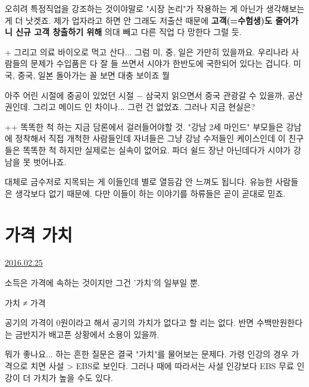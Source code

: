 오히려 특정직업을 강조하는 것이야말로 "시장 논리"가 작용하는 게 아닌가 생각해보는 게 더 낫겟죠.
제가 업자라고 하면 안 그래도 저출산 때문에 \textbf{고객(=수험생)도 줄어가니 신규 고객 창출하기 위해}
의대 빼고 다른 직업 다 망한다 그럴 듯.
\vspace{5mm}

+
그리고 의료 바이오로 먹고 산다... 그럼 미, 중, 일은 가만히 있을까요.
우리나라 사람들의 문제가 수입품은 다 잘 들 쓰면서 시야가 한반도에 국한되어 있다는 겁니다.
미국, 중국, 일본 돌아가는 꼴 보면 대충 보이죠 뭘
\vspace{5mm}

아주 어린 시절에 중공이 있었던 시절 $-$ 삼국지 읽으면서 중국 관광갈 수 있을까, 공산권인데.
그리고 메이드 인 차이나... 그런 건 없었죠. 그러나 지금 현실은?
\vspace{5mm}

++
똑똑한 척 하는 지금 담론에서 걸러들어야할 것. "강남 2세 마인드"
부모들은 강남에 정착해서 직접 개척한 사람들인데 자녀들은 그냥 강남 수저들인 케이스인데
이 친구들은 똑똑한 척 하지만 실제로는 실속이 없어요. 파더 쉴드 장난 아닌데다가 시야가 강남을 못 벗어나죠.
\vspace{5mm}

대체로 금수저로 지목되는 게 이들인데 별로 열등감 안 느껴도 됩니다. 유능한 사람들은 생각보다 없기 때문에.
다만 이들이 하는 이야기를 하류들은 곧이 곧대로 믿죠.
\vspace{5mm}





\section{가격 가치}
\href{https://www.kockoc.com/Apoc/650743}{2016.02.25}

\vspace{5mm}

소득은 가격에 속하는 것이지만 그건 '가치'의 일부일 뿐.
\vspace{5mm}

가치 ≠ 가격
\vspace{5mm}

공기의 가격이 0원이라고 해서 공기의 가치가 없다고 할 리는 없다.
반면 수백만원한다는 금반지가 배고픈 상황에서 소용이 있을까.
\vspace{5mm}

뭐가 좋나요... 하는 흔한 질문은 결국 "가치"를 물어보는 문제다.
가령 인강의 경우 가격으로 치면 사설 > EBS로 보인다.
그러나 때에 따라서는 사설 인강보다 EBS 무료 인강이 더 가치가 높을 수도 있다.
\vspace{5mm}

